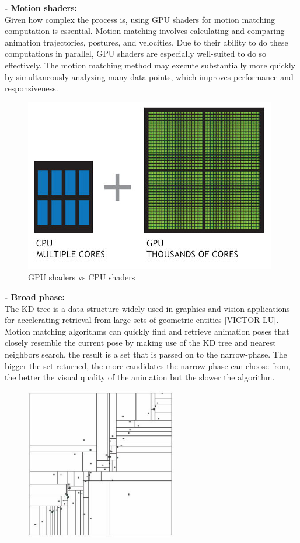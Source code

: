 \documentclass[12pt]{book}
\begin{document}
\begin{itemize}
          \textbf{- Motion shaders:}\\
          Given how complex the process is, using GPU shaders for motion matching computation is essential. Motion matching involves calculating and comparing animation trajectories, postures, and velocities. Due to their ability to do these computations in parallel, GPU shaders are especially well-suited to do so effectively. The motion matching method may execute substantially more quickly by simultaneously analyzing many data points, which improves performance and
          responsiveness.
          \begin{figure}[!h]
              \centering
              \includegraphics[scale=0.8]{./Figures/Images/cpu-and-gpu.jpg}
              \caption{GPU shaders vs CPU shaders}
              \label{GPU shaders vs CPU shaders}
          \end{figure}
          \textbf{- Broad phase:}\\
          The KD tree is a data structure widely used in graphics and vision applications for accelerating
          retrieval from large sets of geometric entities [VICTOR LU].
          Motion matching algorithms can quickly find and retrieve animation poses that closely resemble
          the current pose by making use of the KD tree and nearest neighbors search, the result is a set
          that is passed on to the narrow-phase.
          The bigger the set returned, the more candidates the narrow-phase can choose from, the better
          the visual quality of the animation but the slower the algorithm.
          \begin{figure}[!h]
              \centering
              \includegraphics[scale=0.5]{./Figures/Images/kdTree.jpg}

\end{figure}
\end{itemize}
\end{document}
